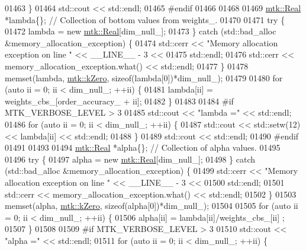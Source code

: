 \begin{DoxyCode}
{{01463   \}
01464   std::cout << std::endl;
01465 \textcolor{preprocessor}{  #endif}
01466 
01468 
01469   \hyperlink{group__c01-roots_gac080bbbf5cbb5502c9f00405f894857d}{mtk::Real} *lambda\{\}; \textcolor{comment}{// Collection of bottom values from weights\_.}
01470 
01471   \textcolor{keywordflow}{try} \{
01472     lambda = \textcolor{keyword}{new} \hyperlink{group__c01-roots_gac080bbbf5cbb5502c9f00405f894857d}{mtk::Real}[dim\_null\_];
01473   \} \textcolor{keywordflow}{catch} (std::bad\_alloc &memory\_allocation\_exception) \{
01474     std::cerr << \textcolor{stringliteral}{"Memory allocation exception on line "} << \_\_LINE\_\_ - 3 <<
01475       std::endl;
01476     std::cerr << memory\_allocation\_exception.what() << std::endl;
01477   \}
01478   memset(lambda, \hyperlink{group__c01-roots_ga59a451a5fae30d59649bcda274fea271}{mtk::kZero}, \textcolor{keyword}{sizeof}(lambda[0])*dim\_null\_);
01479 
01480   \textcolor{keywordflow}{for} (\textcolor{keyword}{auto} ii = 0; ii < dim\_null\_; ++ii) \{
01481     lambda[ii] = weights\_cbs\_[order\_accuracy\_ + ii];
01482   \}
01483 
01484 \textcolor{preprocessor}{  #if MTK\_VERBOSE\_LEVEL > 3}
01485   std::cout << \textcolor{stringliteral}{"lambda ="} << std::endl;
01486   \textcolor{keywordflow}{for} (\textcolor{keyword}{auto} ii = 0; ii < dim\_null\_; ++ii) \{
01487     std::cout << std::setw(12) << lambda[ii] << std::endl;
01488   \}
01489   std::cout << std::endl;
01490 \textcolor{preprocessor}{  #endif}
01491 
01493 
01494   \hyperlink{group__c01-roots_gac080bbbf5cbb5502c9f00405f894857d}{mtk::Real} *alpha\{\}; \textcolor{comment}{// Collection of alpha values.}
01495 
01496   \textcolor{keywordflow}{try} \{
01497     alpha = \textcolor{keyword}{new} \hyperlink{group__c01-roots_gac080bbbf5cbb5502c9f00405f894857d}{mtk::Real}[dim\_null\_];
01498   \} \textcolor{keywordflow}{catch} (std::bad\_alloc &memory\_allocation\_exception) \{
01499     std::cerr << \textcolor{stringliteral}{"Memory allocation exception on line "} << \_\_LINE\_\_ - 3 <<
01500       std::endl;
01501     std::cerr << memory\_allocation\_exception.what() << std::endl;
01502   \}
01503   memset(alpha, \hyperlink{group__c01-roots_ga59a451a5fae30d59649bcda274fea271}{mtk::kZero}, \textcolor{keyword}{sizeof}(alpha[0])*dim\_null\_);
01504 
01505   \textcolor{keywordflow}{for} (\textcolor{keyword}{auto} ii = 0; ii < dim\_null\_; ++ii) \{
01506     alpha[ii] = lambda[ii]/weights\_cbs\_[ii] ;
01507   \}
01508 
01509 \textcolor{preprocessor}{  #if MTK\_VERBOSE\_LEVEL > 3}
01510   std::cout << \textcolor{stringliteral}{"alpha ="} << std::endl;
01511   \textcolor{keywordflow}{for} (\textcolor{keyword}{auto} ii = 0; ii < dim\_null\_; ++ii) \{
}}
\end{DoxyCode}
